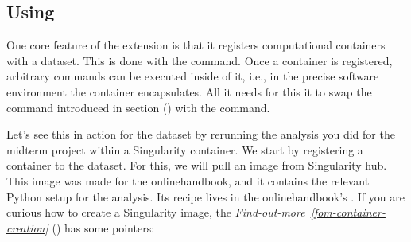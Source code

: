 \ignorespaces 

\subsection{Using }
\label{\detokenize{basics/101-133-containersrun:using-datalad-containers}}\label{\detokenize{basics/101-133-containersrun:index-3}}
\sphinxAtStartPar
One core feature of the  extension is that it registers
computational containers with a dataset. This is done with the
 command.
Once a container is registered, arbitrary commands can be executed inside of
it, i.e., in the precise software environment the container encapsulates. All it
needs for this it to swap the  command introduced in
section {\hyperref[\detokenize{basics/101-108-run:run}]{}} () with the  command.

\sphinxAtStartPar
Let’s see this in action for the  dataset by rerunning
the analysis you did for the midterm project within a Singularity container.
We start by registering a container to the dataset.
For this, we will pull an image from Singularity hub. This image was made
for the online\sphinxhyphen{}handbook, and it contains the relevant Python setup for
the analysis. Its recipe lives in the online\sphinxhyphen{}handbook’s
.
If you are curious how to create a Singularity image, the \textit{Find-out-more}~{\findoutmoreiconinline}\textit{\ref{fom-container-creation}} {\hyperref[\detokenize{basics/101-133-containersrun:fom-container-creation}]{}} () has some pointers:

